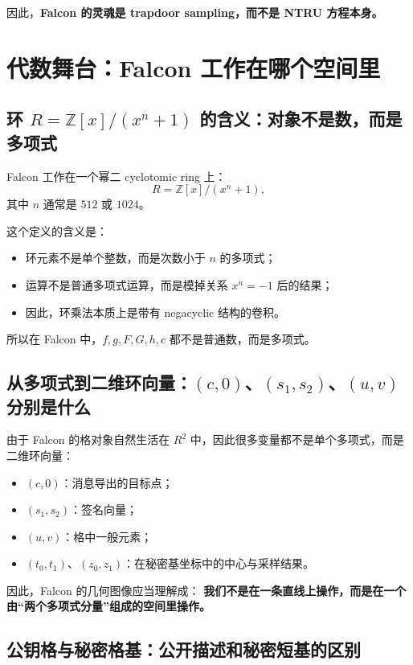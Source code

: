 \documentclass[11pt,a4paper]{ctexart}
\begin{document}
因此，\textbf{Falcon 的灵魂是 trapdoor sampling，而不是 NTRU 方程本身。}

\section{代数舞台：Falcon 工作在哪个空间里}

\subsection{环 \(R=\mathbb Z[x]/(x^n+1)\) 的含义：对象不是数，而是多项式}

Falcon 工作在一个幂二 cyclotomic ring 上：
\[
R=\mathbb Z[x]/(x^n+1),
\]
其中 \(n\) 通常是 \(512\) 或 \(1024\)。

这个定义的含义是：

\begin{itemize}
    \item 环元素不是单个整数，而是次数小于 \(n\) 的多项式；
    \item 运算不是普通多项式运算，而是模掉关系 \(x^n=-1\) 后的结果；
    \item 因此，环乘法本质上是带有 negacyclic 结构的卷积。
\end{itemize}

所以在 Falcon 中，\(f,g,F,G,h,c\) 都不是普通数，而是多项式。

\subsection{从多项式到二维环向量：\((c,0)\)、\((s_1,s_2)\)、\((u,v)\) 分别是什么}

由于 Falcon 的格对象自然生活在 \(R^2\) 中，因此很多变量都不是单个多项式，而是二维环向量：

\begin{itemize}
    \item \((c,0)\)：消息导出的目标点；
    \item \((s_1,s_2)\)：签名向量；
    \item \((u,v)\)：格中一般元素；
    \item \((t_0,t_1)\)、\((z_0,z_1)\)：在秘密基坐标中的中心与采样结果。
\end{itemize}

因此，Falcon 的几何图像应当理解成：  
\textbf{我们不是在一条直线上操作，而是在一个由“两个多项式分量”组成的空间里操作。}

\subsection{公钥格与秘密格基：公开描述和秘密短基的区别}
\end{document}
